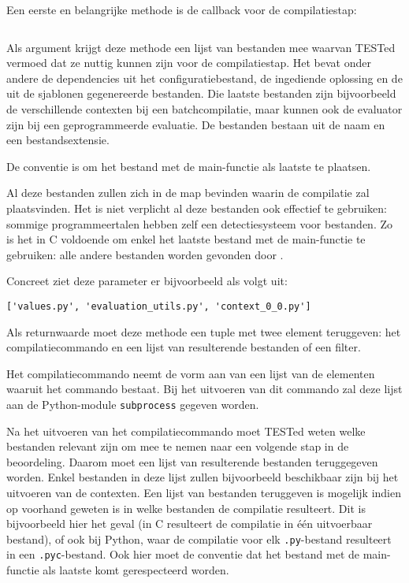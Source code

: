 Een eerste en belangrijke methode is de callback voor de compilatiestap:

\inputminted[firstline=11,lastline=16,gobble=4]{python}{sources/c-config.py}

Als argument krijgt deze methode een lijst van bestanden mee waarvan TESTed vermoed dat ze nuttig kunnen zijn voor de compilatiestap.
Het bevat onder andere de dependencies uit het configuratiebestand, de ingediende oplossing en de uit de sjablonen gegenereerde bestanden.
Die laatste bestanden zijn bijvoorbeeld de verschillende contexten bij een batchcompilatie, maar kunnen ook de evaluator zijn bij een geprogrammeerde evaluatie.
De bestanden bestaan uit de naam en een bestandsextensie.

De conventie is om het bestand met de main-functie als laatste te plaatsen.

Al deze bestanden zullen zich in de map bevinden waarin de compilatie zal plaatsvinden.
Het is niet verplicht al deze bestanden ook effectief te gebruiken: sommige programmeertalen hebben zelf een detectiesysteem voor bestanden.
Zo is het in C voldoende om enkel het laatste bestand met de main-functie te gebruiken: alle andere bestanden worden gevonden door .

Concreet ziet deze parameter er bijvoorbeeld als volgt uit:

\begin{verbatim}
['values.py', 'evaluation_utils.py', 'context_0_0.py']
\end{verbatim}

Als returnwaarde moet deze methode een tuple met twee element teruggeven: het compilatiecommando en een lijst van resulterende bestanden of een filter.

Het compilatiecommando neemt de vorm aan van een lijst van de elementen waaruit het commando bestaat.
Bij het uitvoeren van dit commando zal deze lijst aan de Python-module \texttt{subprocess} gegeven worden.

Na het uitvoeren van het compilatiecommando moet TESTed weten welke bestanden relevant zijn om mee te nemen naar een volgende stap in de beoordeling.
Daarom moet een lijst van resulterende bestanden teruggegeven worden.
Enkel bestanden in deze lijst zullen bijvoorbeeld beschikbaar zijn bij het uitvoeren van de contexten.
Een lijst van bestanden teruggeven is mogelijk indien op voorhand geweten is in welke bestanden de compilatie resulteert.
Dit is bijvoorbeeld hier het geval (in C resulteert de compilatie in één uitvoerbaar bestand), of ook bij Python, waar de compilatie voor elk \texttt{.py}-bestand resulteert in een \texttt{.pyc}-bestand.
Ook hier moet de conventie dat het bestand met de main-functie als laatste komt gerespecteerd worden.

